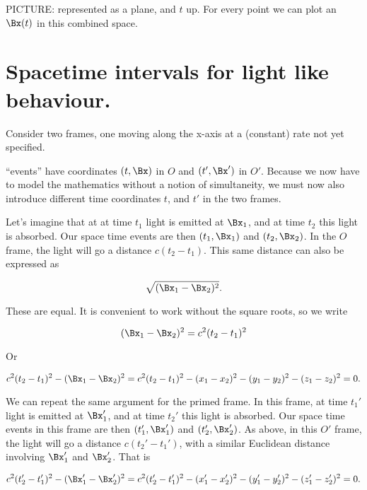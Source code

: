 PICTURE:  represented as a plane, and $t$ up.  For every point we can plot an $\Bx(t)$ in this combined space.

\section{Spacetime intervals for light like behaviour.}

Consider two frames, one moving along the x-axis at a (constant) rate not yet specified.

``events'' have coordinates $(t, \Bx)$ in $O$ and $(t', \Bx')$ in $O'$.  Because we now have to model the mathematics without a notion of simultaneity, we must now also introduce different time coordinates $t$, and $t'$ in the two frames.  

Let's imagine that at at time $t_1$ light is emitted at $\Bx_1$, and at time $t_2$ this light is absorbed.  Our space time events are then $(t_1, \Bx_1)$ and $(t_2, \Bx_2)$.  In the $O$ frame, the light will go a distance $c(t_2 - t_1)$.  This same distance can also be expressed as

\begin{equation}\label{eqn:relativisticElectrodynamicsL1:10}
\sqrt{ (\Bx_1 - \Bx_2)^2}.
\end{equation}

These are equal.  It is convenient to work without the square roots, so we write

\begin{equation}\label{eqn:relativisticElectrodynamicsL1:20}
(\Bx_1 - \Bx_2)^2 = c^2 (t_2 - t_1)^2
\end{equation}

Or

\begin{equation}\label{eqn:relativisticElectrodynamicsL1:30}
c^2 (t_2 - t_1)^2 - (\Bx_1 - \Bx_2)^2 =
c^2 (t_2 - t_1)^2 
- (x_1 - x_2)^2
- (y_1 - y_2)^2
- (z_1 - z_2)^2 = 0.
\end{equation}

We can repeat the same argument for the primed frame.  In this frame, at time $t_1'$ light is emitted at $\Bx_1'$, and at time $t_2'$ this light is absorbed.  Our space time events in this frame are then $(t_1', \Bx_1')$ and $(t_2', \Bx_2')$.  As above, in this $O'$ frame, the light will go a distance $c(t_2' - t_1')$, with a similar Euclidean distance involving $\Bx_1'$ and $\Bx_2'$.  That is

\begin{equation}\label{eqn:relativisticElectrodynamicsL1:40}
c^2 (t_2' - t_1')^2 - (\Bx_1' - \Bx_2')^2 =
c^2 (t_2' - t_1')^2 
- (x_1' - x_2')^2
- (y_1' - y_2')^2
- (z_1' - z_2')^2 = 0.
\end{equation}

